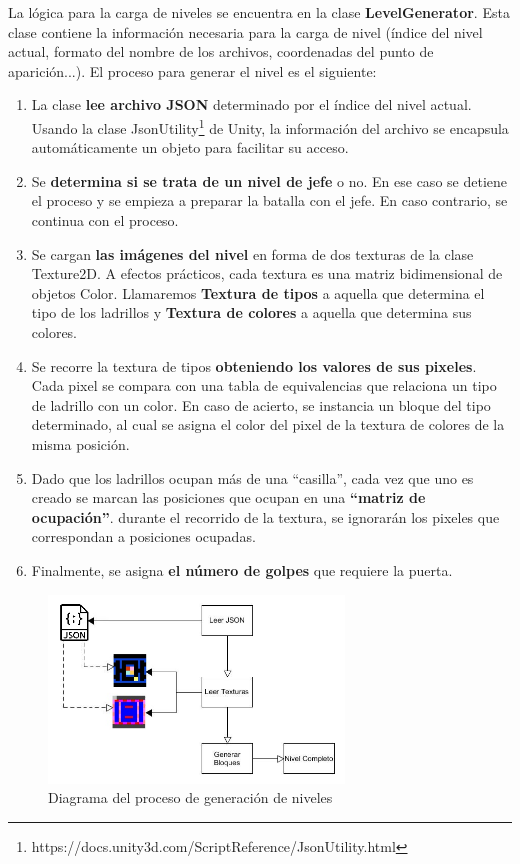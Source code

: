 La lógica para la carga de niveles se encuentra en la clase \textbf{LevelGenerator}. Esta clase contiene la información necesaria para la carga de nivel (índice del nivel actual, formato del nombre de los archivos, coordenadas del punto de aparición...). El proceso para generar el nivel es el siguiente:
\begin{enumerate}
  \item La clase \textbf{lee archivo JSON} determinado por el índice del nivel actual. Usando la clase JsonUtility\footnote{https://docs.unity3d.com/ScriptReference/JsonUtility.html} de Unity, la información del archivo se encapsula automáticamente un objeto para facilitar su acceso.
  \item Se \textbf{determina si se trata de un nivel de jefe} o no. En ese caso se detiene el proceso y se empieza a preparar la batalla con el jefe. En caso contrario, se continua con el proceso.
  \item Se cargan \textbf{las imágenes del nivel} en forma de dos texturas de la clase Texture2D. A efectos prácticos, cada textura es una matriz bidimensional de objetos Color. Llamaremos \textbf{Textura de tipos} a aquella que determina el tipo de los ladrillos y \textbf{Textura de colores} a aquella que determina sus colores.
  \item Se recorre la textura de tipos \textbf{obteniendo los valores de sus pixeles}. Cada pixel se compara con una tabla de equivalencias que relaciona un tipo de ladrillo con un color. En caso de acierto, se instancia un bloque del tipo determinado, al cual se asigna el color del pixel de la textura de colores de la misma posición.
  \item Dado que los ladrillos ocupan más de una ``casilla'', cada vez que uno es creado se marcan las posiciones que ocupan en una \textbf{``matriz de ocupación''}. durante el recorrido de la textura, se ignorarán los pixeles que correspondan a posiciones ocupadas.
  \item Finalmente, se asigna \textbf{el número de golpes} que requiere la puerta.
\end{enumerate}

\begin{figure}[h]
	\includegraphics[width=0.7\textwidth]{images/estructura/escenas/level_generator}
	\centering
	\caption{Diagrama del proceso de generación de niveles}
	\label{generator_diagram}
\end{figure}

